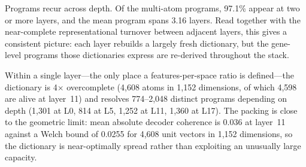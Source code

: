 Programs recur across depth. Of the multi-atom programs, 97.1\% appear at two or more layers, and
the mean program spans 3.16 layers. Read together with the near-complete representational turnover
between adjacent layers, this gives a consistent picture: each layer rebuilds a largely fresh
dictionary, but the gene-level programs those dictionaries express are re-derived throughout the
stack.

Within a single layer---the only place a features-per-space ratio is defined---the dictionary is
4$\times$ overcomplete (4,608 atoms in 1,152 dimensions, of which 4,598 are alive at layer~11) and
resolves 774--2,048 distinct programs depending on depth (1,301 at L0, 814 at L5, 1,252 at L11,
1,360 at L17). The packing is close to the geometric limit: mean absolute decoder coherence is
0.036 at layer~11 against a Welch bound of 0.0255 for 4,608 unit vectors in 1,152 dimensions, so
the dictionary is near-optimally spread rather than exploiting an unusually large capacity.
